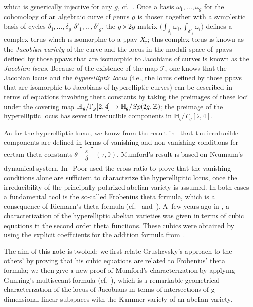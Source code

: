 \documentclass[11pt]{article}
\numberwithin{equation}{section}
\numberwithin{equation}{section}
\newcommand{\de}{\delta}
\newcommand{\ep}{\varepsilon}
\newcommand{\HH}{{\mathbb{H}}}
\newcommand{\ZZ}{{\mathbb{Z}}}
\def\ZZ{{\mathbb Z}}
\begin{document}
which is generically injective for any $g$, cf.~\cite{SM}. Once a basis $\omega_1, \dots , \omega_g$ for the cohomology of an algebraic curve of genus $g$ is chosen together with a symplectic basis of cycles $\de_1, \dots , \de_g, \de'_1, \dots, \de'_g$, the $g \times 2g$ matrix $\big(\int_{\de_j}\omega_i, \int_{\de'_j}\omega_i\big)$ defines a complex torus which is isomorphic to a ppav $X_{\tau}$; this complex torus is known as the {\it Jacobian variety} of the curve and the locus in the moduli space of ppavs defined by those ppavs that are isomorphic to Jacobians of curves is known as the {\it Jacobian locus}. Because of the existence of the map $\mathcal{T}$, one knows that the Jacobian locus and the {\it hyperelliptic locus} (i.e., the locus defined by those ppavs that are isomorphic to Jacobians of hyperelliptic curves) can be described in terms of equations involving theta constants by taking the preimages of these loci under the covering map $\HH_g /\Gamma_g[2,4] \to \HH_g /{\rm Sp}(2g, \ZZ)$; the preimage of the hyperelliptic locus has several irreducible components in $\HH_g /\Gamma_g[2,4]$.

As for the hyperelliptic locus, we know from the result in~\cite{mu} that the irreducible components are defined in terms of vanishing and non-vanishing conditions for certain theta constants $\theta\left[\begin{smallmatrix}\ep \\ \de \end{smallmatrix}\right] (\tau,0)$. Mumford's result is based on Neumann's dynamical system. In~\cite{po} Poor used the cross ratio to prove that the vanishing conditions alone are sufficient to characterize the hyperellipitic locus, once the irreducibility of the principally polarized abelian variety is assumed. In both cases a fundamental tool is the so-called Frobenius theta formula, which is a consequence of Riemann's theta formula (cf.~\cite{FR} and~\cite{mu}). A~few years ago in \cite{Gr}, a characterization of the hyperelliptic abelian varieties was given in terms of cubic equations in the second order theta functions. These cubics were obtained by using the explicit coefficients for the addition formula from~\cite{BK2}.

The aim of this note is twofold: we first relate Grushevsky's approach to the others' by proving that his cubic equations are related to Frobenius' theta formula; we then give a new proof of Mumford's characterization by applying Gunning's multisecant formula (cf.~\cite{Gu}), which is a remarkable geometrical characterization of the locus of Jacobians in terms of intersections of g-dimensional linear subspaces with the Kummer variety of an abelian variety.
\end{document}
